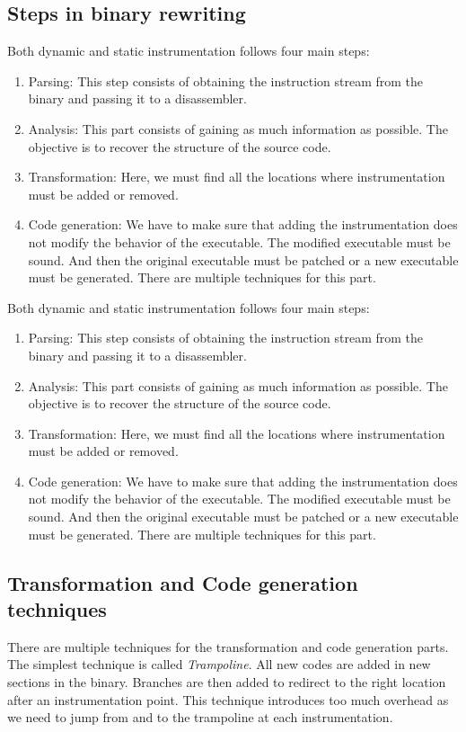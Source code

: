 \documentclass[a4paper,11pt,oneside]{report}
\begin{document}
\subsection{Steps in binary rewriting}
Both dynamic and static instrumentation follows four main steps:
\begin{enumerate}
    \item Parsing:
        This step consists of obtaining the instruction stream from the binary
        and passing it to a disassembler.
    \item Analysis:
        This part consists of gaining as much information as possible. The
        objective is to recover the structure of the source code.
    \item Transformation:
        Here, we must find all the locations where instrumentation must be
        added or removed. 
    \item Code generation:
        We have to make sure that adding the instrumentation does not modify the
        behavior of the executable. The modified executable must be sound. And
        then the original executable must be patched or a new executable must be
        generated.
        There are multiple techniques for this part. 
\end{enumerate}
Both dynamic and static instrumentation follows four main steps:
\begin{enumerate}
    \item Parsing:
        This step consists of obtaining the instruction stream from the binary
        and passing it to a disassembler.
    \item Analysis:
        This part consists of gaining as much information as possible. The
        objective is to recover the structure of the source code.
    \item Transformation:
        Here, we must find all the locations where instrumentation must be
        added or removed. 
    \item Code generation:
        We have to make sure that adding the instrumentation does not modify the
        behavior of the executable. The modified executable must be sound. And
        then the original executable must be patched or a new executable must be
        generated.
        There are multiple techniques for this part. 
\end{enumerate}



\subsection{Transformation and Code generation techniques}
There are multiple techniques for the transformation and code generation
parts. The simplest technique is called \textit{Trampoline}. All new codes are
added in new sections in the binary. Branches are then added to redirect to the
right location after an instrumentation point. This technique introduces too much overhead as we
need to jump from and to the trampoline at each instrumentation. 
\end{document}
